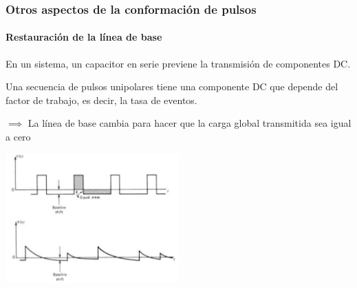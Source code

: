 \documentclass{beamer}
\begin{document}
\begin{frame}
\frametitle{Otros aspectos de la conformación de pulsos}
\framesubtitle{Restauración de la línea de base}
En un sistema, un capacitor en serie previene la transmisión de componentes DC.

Una secuencia de pulsos unipolares tiene una componente DC que depende del
factor de trabajo, es decir, la tasa de eventos.

$\implies$ {\color{blue}La línea de base cambia para hacer que la carga global
transmitida sea igual a cero}
\begin{center}
\includegraphics[width=0.5\textwidth]{d2/baseline_shift2}
\end{center}
\end{frame} 
\end{document}
